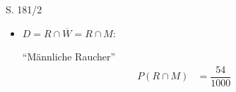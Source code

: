 \begin{Exercise}{S. 181/2}{}
\begin{enumerate}[leftmargin=*]
{\begin{enumerate}[label=\alph*),leftmargin=*]
{\begin{itemize}[leftmargin=*]
\begin{minipage}[t]{0.6\linewidth}
\begin{align*}
                        P(W \cup \overline{R}) &= P(W) + P(\overline{R}) - P(W \cap \overline{R})&&\\[1.5ex]
                        &= \dfrac{550}{1000} + \dfrac{850}{1000} - \dfrac{454}{1000} = \dfrac{946}{1000}
                    \end{align*}
                \end{minipage}
                \item $D = R \cap \overline{W} = R \cap M$: \qquad \begin{minipage}[t]{0.6\linewidth}
                    ``Männliche Raucher''\\[-2.0ex]
                    \begin{align*}
                        P(R \cap M) &= \dfrac{54}{1000}&&
                    \end{align*}
                \end{minipage}
            \end{itemize}
            }
        \end{enumerate}
        }
\end{enumerate}
\end{Exercise}

